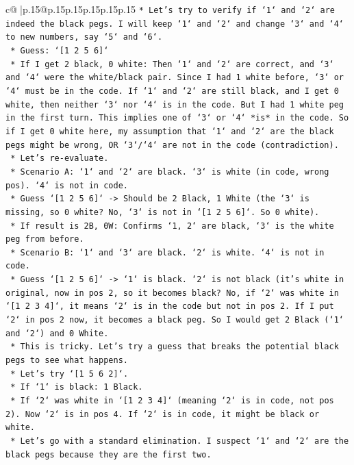 \documentclass{article}
\begin{document}
{\begin{supertabular}{c@{$\;$}|p{.15\linewidth}@{}p{.15\linewidth}p{.15\linewidth}p{.15\linewidth}p{.15\linewidth}p{.15\linewidth}}
{{{\texttt{*   Let's try to verify if `1` and `2` are indeed the black pegs. I will keep `1` and `2` and change `3` and `4` to new numbers, say `5` and `6`.} \\
\texttt{    *   Guess: `{[}1 2 5 6{]}`} \\
\texttt{    *   If I get 2 black, 0 white: Then `1` and `2` are correct, and `3` and `4` were the white/black pair. Since I had 1 white before, `3` or `4` must be in the code. If `1` and `2` are still black, and I get 0 white, then neither `3` nor `4` is in the code. But I had 1 white peg in the first turn. This implies one of `3` or `4` *is* in the code. So if I get 0 white here, my assumption that `1` and `2` are the black pegs might be wrong, OR `3`/`4` are not in the code (contradiction).} \\
\texttt{    *   Let's re{-}evaluate.} \\
\texttt{    *   Scenario A: `1` and `2` are black. `3` is white (in code, wrong pos). `4` is not in code.} \\
\texttt{        *   Guess `{[}1 2 5 6{]}` {-}> Should be 2 Black, 1 White (the `3` is missing, so 0 white? No, `3` is not in `{[}1 2 5 6{]}`. So 0 white).} \\
\texttt{        *   If result is 2B, 0W: Confirms `1, 2` are black, `3` is the white peg from before.} \\
\texttt{    *   Scenario B: `1` and `3` are black. `2` is white. `4` is not in code.} \\
\texttt{        *   Guess `{[}1 2 5 6{]}` {-}> `1` is black. `2` is not black (it's white in original, now in pos 2, so it becomes black? No, if `2` was white in `{[}1 2 3 4{]}`, it means `2` is in the code but not in pos 2. If I put `2` in pos 2 now, it becomes a black peg. So I would get 2 Black (`1` and `2`) and 0 White.} \\
\texttt{    *   This is tricky. Let's try a guess that breaks the potential black pegs to see what happens.} \\
\texttt{    *   Let's try `{[}1 5 6 2{]}`.} \\
\texttt{        *   If `1` is black: 1 Black.} \\
\texttt{        *   If `2` was white in `{[}1 2 3 4{]}` (meaning `2` is in code, not pos 2). Now `2` is in pos 4. If `2` is in code, it might be black or white.} \\
\texttt{    *   Let's go with a standard elimination. I suspect `1` and `2` are the black pegs because they are the first two.} \\
}}}
\end{supertabular}}
\end{document}
